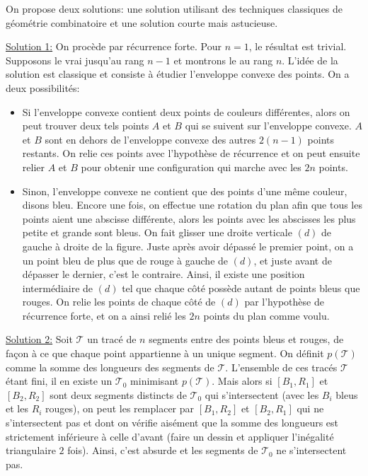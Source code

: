 \begin{sol}
On propose deux solutions: une solution utilisant des techniques classiques de géométrie combinatoire et une solution courte mais astucieuse.

\medskip

\underline{Solution 1:} On procède par récurrence forte. Pour $n=1$, le résultat est trivial. Supposons le vrai jusqu'au rang $n-1$ et montrons le au rang $n$. L'idée de la solution est classique et consiste à étudier l'enveloppe convexe des points. On a deux possibilités:
\begin{itemize}
    \item Si l'enveloppe convexe contient deux points de couleurs différentes, alors on peut trouver deux tels points $A$ et $B$ qui se suivent sur l'enveloppe convexe. $A$ et $B$ sont en dehors de l'enveloppe convexe des autres $2(n-1)$ points restants. On relie ces points avec l'hypothèse de récurrence et on peut ensuite relier $A$ et $B$ pour obtenir une configuration qui marche avec les $2n$ points.
    \item Sinon, l'enveloppe convexe ne contient que des points d'une même couleur, disons bleu. Encore une fois, on effectue une rotation du plan afin que tous les points aient une abscisse différente, alors les points avec les abscisses les plus petite et grande sont bleus. On fait glisser une droite verticale $(d)$ de gauche à droite de la figure. Juste après avoir dépassé le premier point, on a un point bleu de plus que de rouge à gauche de $(d)$, et juste avant de dépasser le dernier, c'est le contraire. Ainsi, il existe une position intermédiaire de $(d)$ tel que chaque côté possède autant de points bleus que rouges. On relie les points de chaque côté de $(d)$ par l'hypothèse de récurrence forte, et on a ainsi relié les $2n$ points du plan comme voulu.
\end{itemize}

\medskip

\underline{Solution 2:} Soit $\mathcal{T}$ un tracé de $n$ segments entre des points bleus et rouges, de façon à ce que chaque point appartienne à un unique segment. On définit $p(\mathcal{T})$ comme la somme des longueurs des segments de $\mathcal{T}$. L'ensemble de ces tracés $\mathcal{T}$ étant fini, il en existe un $\mathcal{T}_0$ minimisant $p(\mathcal{T})$. Mais alors si $[B_1,R_1]$ et $[B_2,R_2]$ sont deux segments distincts de $\mathcal{T}_0$ qui s'intersectent (avec les $B_i$ bleus et les $R_i$ rouges), on peut les remplacer par $[B_1,R_2]$ et $[B_2,R_1]$ qui ne s'intersectent pas et dont on vérifie aisément que la somme des longueurs est strictement inférieure à celle d'avant (faire un dessin et appliquer l'inégalité triangulaire $2$ fois). Ainsi, c'est absurde et les segments de $\mathcal{T}_0$ ne s'intersectent pas.
\end{sol}

